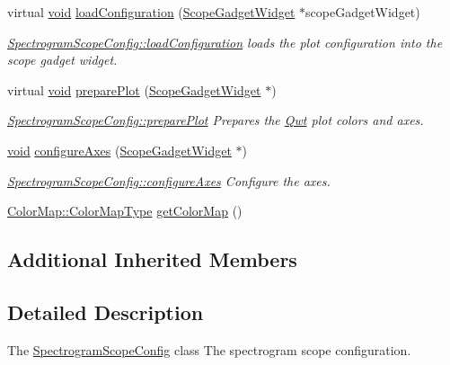 \begin{DoxyCompactItemize}
virtual \hyperlink{group___u_a_v_objects_plugin_ga444cf2ff3f0ecbe028adce838d373f5c}{void} \hyperlink{group___scope_plugin_gaa4de5cf86195631ccdce65d67b22f31a}{load\-Configuration} (\hyperlink{class_scope_gadget_widget}{Scope\-Gadget\-Widget} $\ast$scope\-Gadget\-Widget)
\begin{DoxyCompactList}\small\item\em \hyperlink{group___scope_plugin_gaa4de5cf86195631ccdce65d67b22f31a}{Spectrogram\-Scope\-Config\-::load\-Configuration} loads the plot configuration into the scope gadget widget. \end{DoxyCompactList}\item 
virtual \hyperlink{group___u_a_v_objects_plugin_ga444cf2ff3f0ecbe028adce838d373f5c}{void} \hyperlink{group___scope_plugin_ga56b200887661925df25743af2f62375b}{prepare\-Plot} (\hyperlink{class_scope_gadget_widget}{Scope\-Gadget\-Widget} $\ast$)
\begin{DoxyCompactList}\small\item\em \hyperlink{group___scope_plugin_ga56b200887661925df25743af2f62375b}{Spectrogram\-Scope\-Config\-::prepare\-Plot} Prepares the \hyperlink{namespace_qwt}{Qwt} plot colors and axes. \end{DoxyCompactList}\item 
\hyperlink{group___u_a_v_objects_plugin_ga444cf2ff3f0ecbe028adce838d373f5c}{void} \hyperlink{group___scope_plugin_ga607c43753c7a8540b7953d4945f2f6b5}{configure\-Axes} (\hyperlink{class_scope_gadget_widget}{Scope\-Gadget\-Widget} $\ast$)
\begin{DoxyCompactList}\small\item\em \hyperlink{group___scope_plugin_ga607c43753c7a8540b7953d4945f2f6b5}{Spectrogram\-Scope\-Config\-::configure\-Axes} Configure the axes. \end{DoxyCompactList}\item 
\hyperlink{group___scope_plugin_ga7f4f087196557757ec8061242e795031}{Color\-Map\-::\-Color\-Map\-Type} \hyperlink{group___scope_plugin_ga429eb179a2c1b1f46a1d45a699e983f2}{get\-Color\-Map} ()
\end{DoxyCompactItemize}
\subsection*{Additional Inherited Members}


\subsection{Detailed Description}
The \hyperlink{class_spectrogram_scope_config}{Spectrogram\-Scope\-Config} class The spectrogram scope configuration. 

